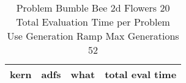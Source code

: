 \begin{table}[H]
\caption{Problem  Bumble Bee 2d  Flowers 20\\Total Evaluation Time per Problem \\ Use Generation Ramp  Max Generations 52\\}
\begin{center}
\scalebox{1.0} %
{
\begin{tabular}{lllr}
\hline
kern & adfs & what & total eval time \\
\hline


\end{tabular}
}
\end{center}
\end{table}

